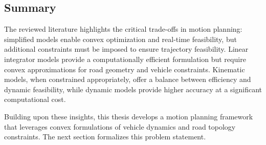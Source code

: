 
\subsection{Summary}

The reviewed literature highlights the critical trade-offs in motion planning: simplified models enable convex optimization and real-time
feasibility, but additional constraints must be imposed to ensure trajectory feasibility.
Linear integrator models provide a computationally efficient formulation but require convex approximations for road geometry and vehicle constraints.
Kinematic models, when constrained appropriately, offer a balance between efficiency and dynamic feasibility, while dynamic models provide higher
accuracy at a significant computational cost.

Building upon these insights, this thesis develops a motion planning framework that leverages convex formulations of vehicle dynamics and road
topology constraints.
The next section formalizes this problem statement.

